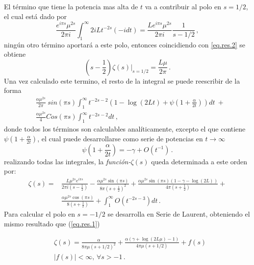 El término que tiene la potencia mas alta de $t$ va a contribuir al polo en $s=1/2$, el cual está dado por
\begin{equation}
    \frac{e^{i \pi s} \mu ^{2s} }{2 \pi i }
    \int _1 ^{\infty}
    2 i L    
    t ^{-2 s}
    (-i dt) =  
    \frac{L e^{i \pi s} \mu ^{2s}}{2 \pi i} \frac{1}{s-1/2   }
    	\, ,
\end{equation}
ningún otro término aportará a este polo, entonces coincidiendo con \ref{eq.res.2} se obtiene
\begin{equation}
	\left(s- \frac{1}{2} \right)
    \zeta (s) \Big| _{s=1/2} = \frac{L \mu }{2 \pi} 
    	\, .
\end{equation}
Una vez calculado este termino, el resto de la integral se puede reescribir de la forma
\begin{align}
    & \frac{\alpha \mu ^{2s} }{2 \pi} \ sin(\pi s)
    \int _1 ^{\infty}
    t ^{-2 s-2} 
    \left(
    1 -  \log (2Lt) + \psi \left( 1 + \frac{\alpha}{2t} \right)
    \right) dt \ + 
    	\nonumber \\[5pt]
    &
    \frac{\alpha \mu ^{2s} }{4} 
    Cos(\pi s)
    \int _1 ^{\infty} t^{-2s-2} dt
    	\, ,
\end{align}
donde todos los términos son calculables analíticamente, excepto el que contiene $\psi \left( 1 + \frac{\alpha}{2t} \right)$, el cual puede desarrollarse como serie de potencias en $t \rightarrow \infty$
\begin{equation}
    \psi \left(1 + \frac{\alpha}{2 t} \right) =
    - \gamma + O \left( t^{-1} \right)
    \, .
\end{equation}
realizando todas las integrales, la {\it función-$\zeta (s)$} queda determinada a este orden por:  
\begin{equation}\label{eq.laurent}
\begin{aligned}
    \zeta  (s)  = 
    & \frac{L \mu ^{2 s} e ^{i \pi s}}{2 \pi i (s-\frac{1}{2})}  
    -\frac{\alpha \mu ^{2s} \sin(\pi s)}{8 \pi (s+\frac{1}{2}) ^2}  + 
    \frac{\alpha \mu ^{2s} \sin  (\pi s) (1 - \gamma -   \log (2 L))}{4 \pi (s+ \frac{1}{2} )} + \\
    & \frac{\alpha \mu ^{2s} \cos(\pi s)}{8 (s+\frac{1}{2} )} +
    \int _1 ^{\infty} O \left( t ^{-2s-3} \right) dt
    	\, .
\end{aligned}
\end{equation}
Para calcular el polo en $s=-1/2$ se desarrolla en Serie de Laurent, obteniendo el mismo resultado que (\ref{eq.res.1})


\begin{align}
\label{eq.result.zeta.c}
\nonumber	
    &\zeta  (s) =  \frac{\alpha}{8  \pi \mu (s+1/2)^2} +
    \frac{ \alpha ( \gamma  +  \log (2L \mu ) -1 ) }{4  \pi \mu (s+1/2) }  + 
	f (s) \\
	&| f(s) | < \infty , \, \forall s > -1
    	\, .
\end{align}


